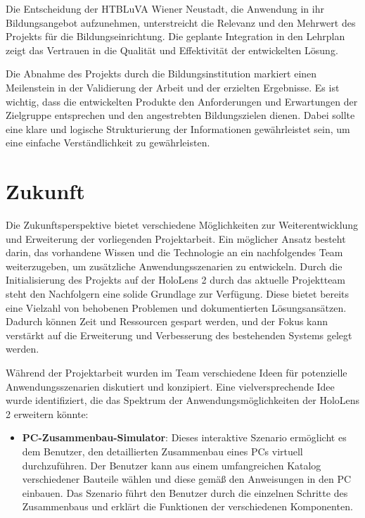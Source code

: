 Die Entscheidung der HTBLuVA Wiener Neustadt, die Anwendung in ihr Bildungsangebot aufzunehmen, unterstreicht die Relevanz
und den Mehrwert des Projekts für die Bildungseinrichtung. Die geplante Integration in den Lehrplan zeigt das Vertrauen
in die Qualität und Effektivität der entwickelten Lösung.

Die Abnahme des Projekts durch die Bildungsinstitution markiert einen Meilenstein in der Validierung der Arbeit und der
erzielten Ergebnisse. Es ist wichtig, dass die entwickelten Produkte den Anforderungen und Erwartungen der Zielgruppe
entsprechen und den angestrebten Bildungszielen dienen. Dabei sollte eine klare und logische Strukturierung der Informationen
gewährleistet sein, um eine einfache Verständlichkeit zu gewährleisten.

\section{Zukunft}
Die Zukunftsperspektive bietet verschiedene Möglichkeiten zur Weiterentwicklung und Erweiterung der vorliegenden Projektarbeit.
Ein möglicher Ansatz besteht darin, das vorhandene Wissen und die Technologie an ein nachfolgendes Team weiterzugeben,
um zusätzliche Anwendungsszenarien zu entwickeln. Durch die Initialisierung des Projekts auf der HoloLens 2 durch das aktuelle
Projektteam steht den Nachfolgern eine solide Grundlage zur Verfügung. Diese bietet bereits eine Vielzahl von behobenen
Problemen und dokumentierten Lösungsansätzen. Dadurch können Zeit und Ressourcen gespart werden, und der Fokus kann
verstärkt auf die Erweiterung und Verbesserung des bestehenden Systems gelegt werden.

Während der Projektarbeit wurden im Team verschiedene Ideen für potenzielle Anwendungsszenarien diskutiert und konzipiert.
Eine vielversprechende Idee wurde identifiziert, die das Spektrum der Anwendungsmöglichkeiten der HoloLens 2 erweitern könnte:

\begin{itemize}
    \item \textbf{PC-Zusammenbau-Simulator}: Dieses interaktive Szenario ermöglicht es dem Benutzer, den detaillierten
    Zusammenbau eines PCs virtuell durchzuführen. Der Benutzer kann aus einem umfangreichen Katalog verschiedener Bauteile
    wählen und diese gemäß den Anweisungen in den PC einbauen. Das Szenario führt den Benutzer durch die einzelnen Schritte 
    des Zusammenbaus und erklärt die Funktionen der verschiedenen Komponenten.
\end{itemize}